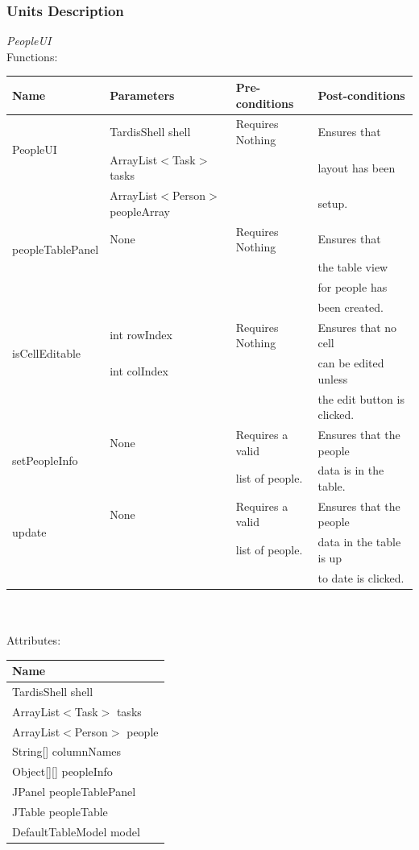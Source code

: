\subsubsection{Units Description}
\emph{PeopleUI}\\
Functions:\\
\begin{tabular}{| l | l | l | l |}
\hline
Name & Parameters & Pre-conditions & Post-conditions\\
\hline
\multirow{2}{*}{PeopleUI}{} & TardisShell shell & Requires Nothing & Ensures that\\ 
			        & ArrayList$<$Task$>$ tasks & & layout has been\\ 
                                            & ArrayList$<$Person$>$ peopleArray & &  setup.
\\
\hline
\multirow{2}{*}{peopleTablePanel} & None & Requires Nothing & Ensures that\\
& & & the table view\\
& & & for people has\\
& & & been created.
\\
\hline
\multirow{2}{*}{isCellEditable} & int rowIndex & Requires Nothing & Ensures that no cell\\
		 		  & int colIndex & & can be edited unless\\
		 		  & & & the edit button is clicked.
\\
\hline
\multirow{2}{*}{setPeopleInfo} & None & Requires a valid & Ensures that the people\\
		 		    &          & list of people.     & data is in the table.
\\
\hline
\multirow{2}{*}{update} & None & Requires a valid & Ensures that the people\\
		                 &          & list of people.     & data in the table is up\\
		                 &          &                            & to date is clicked.
\\
\hline
\end{tabular}\\
\\
Attributes:\\
\begin{tabular}{| l |}
\hline
Name\\
\hline
TardisShell shell\\
\hline
ArrayList$<$Task$>$ tasks\\
\hline
ArrayList$<$Person$>$ people\\
\hline
String[] columnNames\\
\hline
Object[][] peopleInfo\\
\hline
JPanel peopleTablePanel\\
\hline
JTable peopleTable\\
\hline
DefaultTableModel model\\
\hline
\end{tabular}

